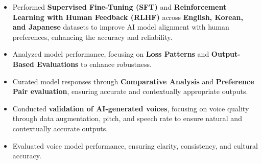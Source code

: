\documentclass[10pt,a4paper,ragged2e,withhyper]{altacv}
\begin{document}

\begin{itemize}
\item Performed {\bf Supervised Fine-Tuning (SFT)} and {\bf Reinforcement Learning with Human Feedback (RLHF)} across {\bf English, Korean, and Japanese} datasets to improve AI model alignment with human preferences, enhancing the accuracy and reliability.
\item Analyzed model performance, focusing on {\bf Loss Patterns} and {\bf Output-Based Evaluations} to enhance robustness. 
\item Curated model responses through {\bf Comparative Analysis} and {\bf Preference Pair evaluation}, ensuring accurate and contextually appropriate outputs.
\end{itemize}
\divider


\begin{itemize}
\item Conducted {\bf validation of AI-generated voices}, focusing on voice quality through data augmentation, pitch, and speech rate to ensure natural and contextually accurate outputs.
\item Evaluated voice model performance, ensuring clarity, consistency, and cultural accuracy.
\end{itemize}
\divider

\end{document}
